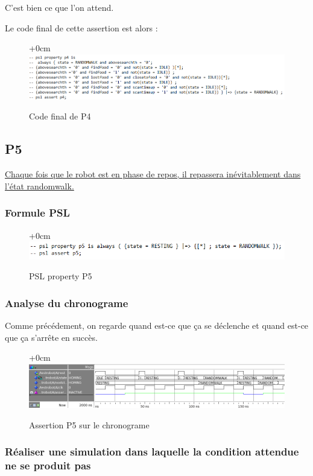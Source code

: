 \documentclass{article}
\newcommand{\sautligne}{
\textbf{\vspace{5mm}}
}
\begin{document}
C'est bien ce que l'on attend.
\sautligne

Le code final de cette assertion est alors : 

 \begin{figure}[!h]
\advance\leftskip+0cm
\includegraphics[scale=0.6]{PSL/P4-5.PNG}
\caption{Code final de P4 }
\end{figure}


\newpage
\subsection{P5}
\uline{Chaque fois que le robot est en phase de repos, il repassera inévitablement dans l'état
randomwalk.}
\subsubsection{Formule PSL }
\begin{figure}[!h]
\advance\leftskip+0cm
\includegraphics[scale=0.7]{PSL/P5.PNG}
\caption{PSL property P5}
\end{figure}

\subsubsection{Analyse du chronograme}

Comme précédement, on regarde quand est-ce que ça se déclenche et quand est-ce que ça s'arrête en succès.

\begin{figure}[!h]
\advance\leftskip+0cm
\includegraphics[scale=0.6]{PSL/P5-1.PNG}
\caption{Assertion P5 sur le chronograme }
\end{figure}

\subsubsection{ Réaliser une simulation
dans laquelle la condition attendue ne se produit pas}
\end{document}
